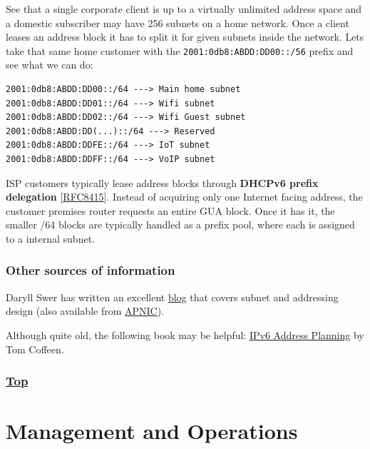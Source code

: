 \documentclass[
]{article}
\begin{document}
See that a single corporate client is up to a virtually unlimited
address space and a domestic subscriber may have 256 subnets on a home
network. Once a client leases an address block it has to split it for
given subnets inside the network. Let\textquotesingle s take that same
home customer with the \texttt{2001:0db8:ABDD:DD00::/56} prefix and see
what we can do:

\begin{verbatim}
2001:0db8:ABDD:DD00::/64 ---> Main home subnet
2001:0db8:ABDD:DD01::/64 ---> Wifi subnet
2001:0db8:ABDD:DD02::/64 ---> Wifi Guest subnet
2001:0db8:ABDD:DD(...)::/64 ---> Reserved
2001:0db8:ABDD:DDFE::/64 ---> IoT subnet
2001:0db8:ABDD:DDFF::/64 ---> VoIP subnet
\end{verbatim}

ISP customers typically lease address blocks through \textbf{DHCPv6
prefix delegation}
{[}\href{https://www.rfc-editor.org/info/rfc8415}{RFC8415}{]}. Instead
of acquiring only one Internet facing address, the customer premises
router requests an entire GUA block. Once it has it, the smaller /64
blocks are typically handled as a prefix pool, where each is assigned to
a internal subnet.

\subsubsection{Other sources of
information}\label{other-sources-of-information}

Daryll Swer has written an excellent
\href{https://www.daryllswer.com/ipv6-architecture-and-subnetting-guide-for-network-engineers-and-operators/}{blog}
that covers subnet and addressing design (also available from
\href{https://blog.apnic.net/2023/04/04/ipv6-architecture-and-subnetting-guide-for-network-engineers-and-operators/}{APNIC}).

Although quite old, the following book may be helpful:
\href{https://www.oreilly.com/library/view/ipv6-address-planning/9781491908211/}{IPv6
Address Planning} by Tom Coffeen.

\subsubsection{\texorpdfstring{\hyperref[network-design]{Top}}{Top}}\label{top}

\pagebreak

\section{Management and Operations}\label{management-and-operations}
\end{document}
